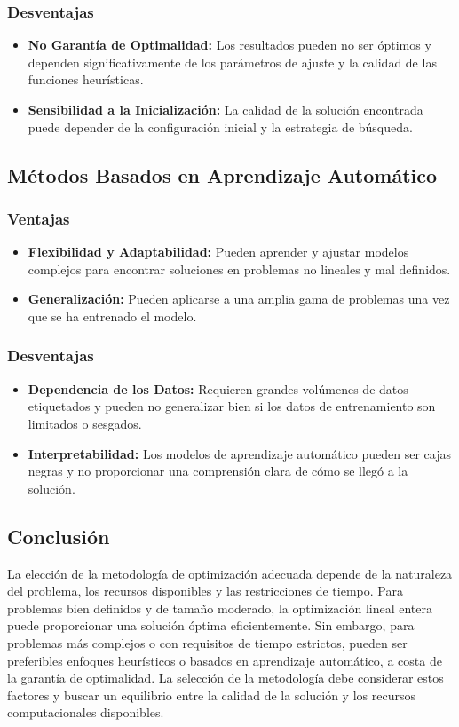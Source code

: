 \documentclass{article}
\begin{document}
\subsubsection*{Desventajas}
\begin{itemize}
    \item \textbf{No Garantía de Optimalidad:} Los resultados pueden no ser óptimos y dependen significativamente de los parámetros de ajuste y la calidad de las funciones heurísticas.
    \item \textbf{Sensibilidad a la Inicialización:} La calidad de la solución encontrada puede depender de la configuración inicial y la estrategia de búsqueda.
\end{itemize}

\subsection*{Métodos Basados en Aprendizaje Automático}

\subsubsection*{Ventajas}
\begin{itemize}
    \item \textbf{Flexibilidad y Adaptabilidad:} Pueden aprender y ajustar modelos complejos para encontrar soluciones en problemas no lineales y mal definidos.
    \item \textbf{Generalización:} Pueden aplicarse a una amplia gama de problemas una vez que se ha entrenado el modelo.
\end{itemize}

\subsubsection*{Desventajas}
\begin{itemize}
    \item \textbf{Dependencia de los Datos:} Requieren grandes volúmenes de datos etiquetados y pueden no generalizar bien si los datos de entrenamiento son limitados o sesgados.
    \item \textbf{Interpretabilidad:} Los modelos de aprendizaje automático pueden ser cajas negras y no proporcionar una comprensión clara de cómo se llegó a la solución.
\end{itemize}

\subsection*{Conclusión}

La elección de la metodología de optimización adecuada depende de la naturaleza del problema, los recursos disponibles y las restricciones de tiempo. Para problemas bien definidos y de tamaño moderado, la optimización lineal entera puede proporcionar una solución óptima eficientemente. Sin embargo, para problemas más complejos o con requisitos de tiempo estrictos, pueden ser preferibles enfoques heurísticos o basados en aprendizaje automático, a costa de la garantía de optimalidad. La selección de la metodología debe considerar estos factores y buscar un equilibrio entre la calidad de la solución y los recursos computacionales disponibles.
\end{document}
